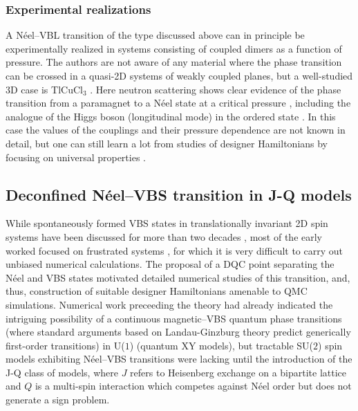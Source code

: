 \documentclass[range]{ar2e}
\begin{document}
\subsubsection{Experimental realizations}
A N\'eel--VBL transition of the type discussed above can in principle be experimentally realized in systems consisting of coupled dimers as a function 
of pressure. The authors are not aware of any material where the phase transition can be crossed in a quasi-2D systems of weakly 
coupled planes, but a well-studied 3D case is TlCuCl$_3$ \cite{Cavadini01,Ruegg04}. Here neutron scattering shows clear evidence of the phase transition 
from a paramagnet to a N\'eel state at a critical pressure \cite{Ruegg08}, including the analogue of the Higgs boson (longitudinal mode) in the ordered 
state \cite{Sachdev09}. In this case the values of the couplings and their pressure dependence are not known in detail, but one can still learn a lot from 
studies of designer Hamiltonians by focusing on universal properties \cite{Troyer97,Yao07,Jin12,Oitmaa11}.

\subsection{Deconfined N\'eel--VBS transition in J-Q models}
\label{ss:jq2}
While spontaneously formed VBS states in translationally invariant 2D spin systems have been discussed for more than two decades \cite{Chandra88,Dagotto89,Read89},
most of the early worked focused on frustrated systems \cite{Dagotto89,Schulz96,Capriotti01}, for which it is very difficult to carry out unbiased numerical 
calculations. The proposal of a DQC point separating the N\'eel and VBS states motivated detailed numerical studies of this transition, and, thus, construction 
of suitable designer 
Hamiltonians amenable to QMC simulations. Numerical work preceeding the theory \cite{Sandvik02} had already indicated the intriguing possibility of 
a continuous magnetic--VBS quantum phase transitions (where standard arguments based on Landau-Ginzburg theory predict generically first-order transitions) in
U($1$) (quantum XY models), but tractable SU($2$) spin models exhibiting N\'eel--VBS transitions were lacking until the introduction of the J-Q class of models, 
where $J$ refers to Heisenberg exchange on a bipartite lattice and $Q$ is a multi-spin interaction which competes against N\'eel order but does not generate 
a sign problem. 
\end{document}
